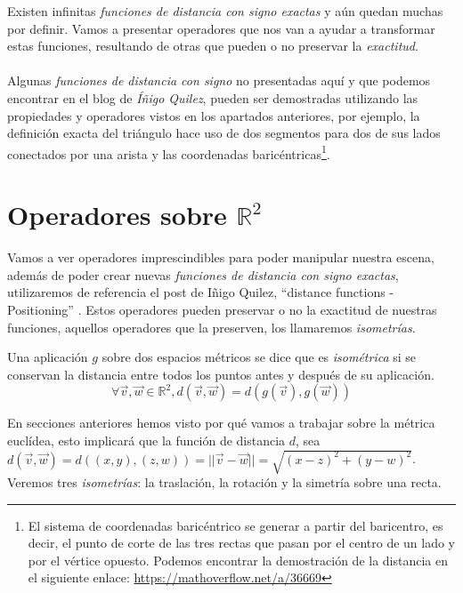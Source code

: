 Existen infinitas \textit{funciones de distancia con signo exactas} y aún quedan muchas por definir. Vamos a presentar operadores que nos van a ayudar a transformar estas funciones, resultando de otras que pueden o no preservar la \textit{exactitud}.\\\\
Algunas \textit{funciones de distancia con signo} no presentadas aquí y que podemos encontrar en el blog de \textit{Íñigo Quilez}, pueden ser demostradas utilizando las propiedades y operadores vistos en los apartados anteriores, por ejemplo, la definición exacta del triángulo hace uso de dos segmentos para dos de sus lados conectados por una arista y las coordenadas baricéntricas\footnote{El sistema de coordenadas baricéntrico se generar a partir del baricentro, es decir, el punto de corte de las tres rectas que pasan por el centro de un lado y por el vértice opuesto. Podemos encontrar la demostración de la distancia en el siguiente enlace: \url{https://mathoverflow.net/a/36669}}.

\section{Operadores sobre \(\mathbb{R}^2\)}
Vamos a ver operadores imprescindibles para poder manipular nuestra escena, además de poder crear nuevas \textit{funciones de distancia con signo exactas}, utilizaremos de referencia el post de Iñigo Quilez, \enquote{distance functions - Positioning} \cite{3ddistinigo}. Estos operadores pueden preservar o no la exactitud de nuestras funciones, aquellos operadores que la preserven, los llamaremos \textit{isometrías}.

\begin{definition}
Una aplicación \(g\) sobre dos espacios métricos se dice que es \textit{isométrica} si se conservan la distancia entre todos los puntos antes y después de su aplicación. \[\forall \Vec{v},\Vec{w} \in\mathbb{R}^2, d(\Vec{v},\Vec{w})=d(g(\Vec{v}),g(\Vec{w}))\]
\end{definition}

En secciones anteriores hemos visto por qué vamos a trabajar sobre la métrica euclídea, esto implicará que la función de distancia \(d\), sea  \(d(\Vec{v},\Vec{w})=d((x,y),(z,w))=\vert\vert \Vec{v}-\Vec{w}\vert\vert=\sqrt{(x-z)^2+(y-w)^2}\). Veremos tres \textit{isometrías}: la traslación, la rotación y la simetría sobre una recta.

